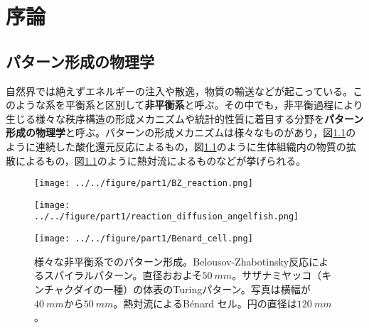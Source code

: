 \documentclass[autodetect-engine,dvi=dvipdfmx,a4paper,ja=standard,oneside,openany,11pt]{bxjsbook}
\begin{document}
\chapter{序論}
\section{パターン形成の物理学}
自然界では絶えずエネルギーの注入や散逸，物質の輸送などが起こっている。このような系を平衡系と区別して\textbf{非平衡系}と呼ぶ。その中でも，非平衡過程により生じる様々な秩序構造の形成メカニズムや統計的性質に着目する分野を\textbf{パターン形成の物理学}と呼ぶ。パターンの形成メカニズムは様々なものがあり，図\ref{fig:pattern_formation}のように連続した酸化還元反応によるもの，図\ref{fig:pattern_formation}のように生体組織内の物質の拡散によるもの，図\ref{fig:pattern_formation}のように熱対流によるものなどが挙げられる。

\begin{figure}[htbp]
  \centering
  \begin{minipage}
    {0.32\textwidth}
    \subcaption{}
    \centering
    \texttt{[image: ../../figure/part1/BZ\_reaction.png]}
    \label{fig:BZ}
  \end{minipage}
  \begin{minipage}
    {0.32\textwidth}
    \subcaption{}
    \centering
    \texttt{[image: ../../figure/part1/reaction\_diffusion\_angelfish.png]}
    \label{fig:reaction_diffusion_angelfish}
  \end{minipage}
  \begin{minipage}
    {0.32\textwidth}
    \subcaption{}
    \centering
    \texttt{[image: ../../figure/part1/Benard\_cell.png]}
    \label{fig:Benard_cell}
  \end{minipage}
  \caption{様々な非平衡系でのパターン形成。Belousov-Zhabotinsky反応によるスパイラルパターン\cite{BZ_reaction}。直径おおよそ$\SI{50}{mm}$。サザナミヤッコ（キンチャクダイの一種）の体表のTuringパターン。写真は横幅が$\SI{40}{mm}$から$\SI{50}{mm}$\cite{kondo1995reaction}。熱対流によるB{\'e}nard セル。円の直径は$\SI{120}{mm}${\cite{eckert1998square}}。}
  \label{fig:pattern_formation}
\end{figure}
\end{document}
